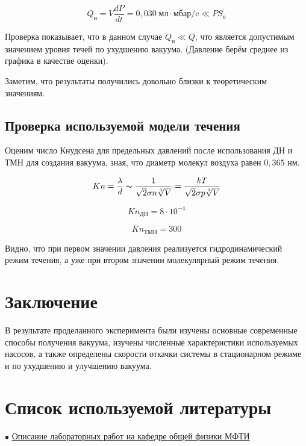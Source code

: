 \documentclass[a4paper, 12pt]{article} %
\begin{document}
\begin{equation}
	Q_{\text{н}} = V \frac{dP}{dt} = 0,030 \; \text{мл} \cdot \text{мбар/c} \ll P S_{\text{о}}
\end{equation}

Проверка показывает, что в данном случае $Q_{\text{н}} \ll Q$, что является допустимым значением уровня течей по ухудшению вакуума. (Давление берём среднее из графика в качестве оценки).

Заметим, что результаты получились довольно близки к теоретическим значениям.

\subsection{Проверка используемой модели течения}

Оценим число Кнудсена для предельных давлений после использования ДН и ТМН для создания вакуума, зная, что диаметр молекул воздуха равен $0,365$ нм.

\begin{equation}
	Kn = \frac{\lambda}{d} \thicksim \frac{1}{\sqrt{2} \sigma n \sqrt[3]{V}} = \frac{kT}{\sqrt{2} \sigma p \sqrt[3]{V}}
\end{equation}

\begin{equation}
	Kn_{\text{ДН}} = 8 \cdot 10^{-4}
\end{equation}

\begin{equation}
	Kn_{\text{ТМН}} = 300
\end{equation}

Видно, что при первом значении давления реализуется гидродинамический режим течения, а уже при втором значении молекулярный режим течения.

\section{Заключение}

В результате проделанного эксперимента были изучены основные современные способы получения вакуума, изучены численные характеристики используемых насосов, а также определены скорости откачки системы в стационарном режиме и по ухудшению и улучшению вакуума.


\section{Список используемой литературы}

$\bullet$ \href{https://mipt.ru/education/chair/physics/S_II/lab/}{Описание лабораторных работ на кафедре общей физики МФТИ}






 
\end{document}
